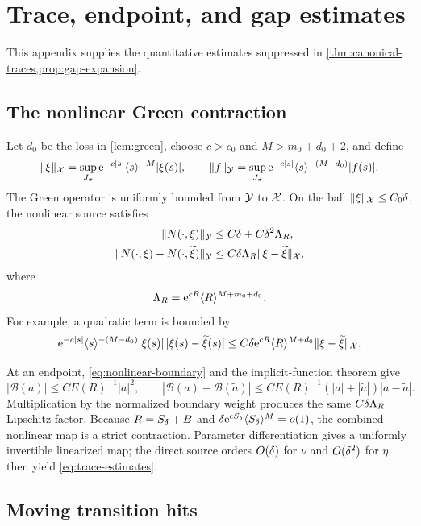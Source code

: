 \section{Trace, endpoint, and gap estimates}
\label{app:green-gap}

This appendix supplies the quantitative estimates suppressed in
\cref{thm:canonical-traces,prop:gap-expansion}.

\subsection{The nonlinear Green contraction}

Let \(d_0\) be the loss in \cref{lem:green}, choose \(c>c_0\) and
\(M>m_0+d_0+2\), and define
\[
 \|\xi\|_\mathcal X
 =\sup_{J_\sigma}\mathrm e^{-c|s|}\langle s\rangle^{-M}|\xi(s)|,
 \qquad
 \|f\|_\mathcal Y
 =\sup_{J_\sigma}\mathrm e^{-c|s|}
   \langle s\rangle^{-(M-d_0)}|f(s)|.
\]
The Green operator is uniformly bounded from \(\mathcal Y\) to \(\mathcal X\).
On the ball \(\|\xi\|_\mathcal X\le C_0\delta\), the nonlinear source satisfies
\begin{align}
 \|N(\cdot,\xi)\|_\mathcal Y
 &\le C\delta+C\delta^2\Lambda_R,\\
 \|N(\cdot,\xi)-N(\cdot,\widetilde\xi)\|_\mathcal Y
 &\le C\delta\Lambda_R\|\xi-\widetilde\xi\|_\mathcal X,
 \label{eq:appendix-N-lipschitz}
\end{align}
where
\[
 \Lambda_R=\mathrm e^{cR}\langle R\rangle^{M+m_0+d_0}.
\]
For example, a quadratic term is bounded by
\[
 \mathrm e^{-c|s|}\langle s\rangle^{-(M-d_0)}
 |\xi(s)|\,|\xi(s)-\widetilde\xi(s)|
 \le C\delta\mathrm e^{cR}\langle R\rangle^{M+d_0}
       \|\xi-\widetilde\xi\|_\mathcal X.
\]

At an endpoint, \cref{eq:nonlinear-boundary} and the implicit-function
theorem give
\[
 |\mathcal B(a)|\le CE(R)^{-1}|a|^2,
 \qquad
 |\mathcal B(a)-\mathcal B(\widetilde a)|
 \le CE(R)^{-1}(|a|+|\widetilde a|)|a-\widetilde a|.
\]
Multiplication by the normalized boundary weight produces the same
\(C\delta\Lambda_R\) Lipschitz factor.  Because
\(R=S_\delta+B\) and
\(\delta\mathrm e^{cS_\delta}\langle S_\delta\rangle^M=o(1)\),
the combined nonlinear map is a strict contraction.  Parameter
differentiation gives a uniformly invertible linearized map; the direct
source orders \(O(\delta)\) for \(\nu\) and \(O(\delta^2)\) for \(\eta\)
then yield \cref{eq:trace-estimates}.

\subsection{Moving transition hits}
\label{app:moving-hits}

